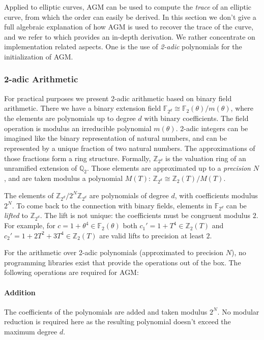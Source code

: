 \documentclass[11pt,english]{article}
\begin{document}
Applied to elliptic curves, AGM can be used to compute the \emph{trace} of an elliptic curve, from which the order can easily be derived. In this section we don't give a full algebraic explanation of how AGM is used to recover the trace of the curve, and we refer to \cite{handbook} which provides an in-depth derivation. We rather concentrate on implementation related aspects. One is the use of \emph{2-adic} polynomials for the initialization of AGM.

\subsubsection{2-adic Arithmetic}
For practical purposes we present 2-adic arithmetic based on binary field arithmetic. There we have a binary extension field $\mathbb{F}_{2^d}\cong \mathbb{F}_2(\theta)/m(\theta)$, where the elements are polynomials up to degree $d$ with binary coefficients. The field operation is modulus an irreducible polynomial $m(\theta)$. 2-adic integers can be imagined like the binary representation of natural numbers, and can be represented by a unique fraction of two natural numbers. The approximations of those fractions form a ring structure. Formally, $\mathbb{Z}_{2^d}$ is the valuation ring of an unramified extension of $\mathbb{Q}_2$. Those elements are approximated up to a \emph{precision} $N$, and are taken modulus a polynomial $M(T)$: $\mathbb{Z}_{2^d}\cong \mathbb{Z}_2(T)/M(T)$.

The elements of $\mathbb{Z}_{2^d}/2^N\mathbb{Z}_{2^d}$ are polynomials of degree $d$, with coefficients modulus $2^N$. To come back to the connection with binary fields, elements in $\mathbb{F}_{2^d}$ can be \emph{lifted} to $\mathbb{Z}_{2^d}$. The lift is not unique: the coefficients must be congruent modulus $2$. For example, for $c=1+\theta^4\in \mathbb{F}_{2}(\theta)$ both $c_1'=1+T^4\in\mathbb{Z}_{2}(T)$ and $c_2'=1+2T^2+3T^4\in\mathbb{Z}_{2}(T)$ are valid lifts to precision at least $2$.

For the arithmetic over 2-adic polynomials (approximated to precision $N$), no programming libraries exist that provide the operations out of the box. The following operations are required for AGM:

\paragraph{Addition}
The coefficients of the polynomials are added and taken modulus $2^N$. No modular reduction is required here as the resulting polynomial doesn't exceed the maximum degree $d$.
\end{document}
